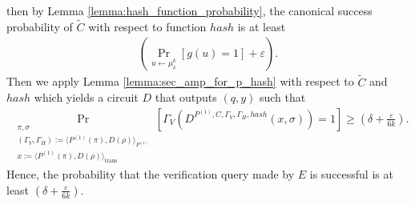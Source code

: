 then by Lemma \ref{lemma:hash_function_probability}, the canonical success
probability of $\widetilde{C}$ with respect to function $hash$ is at least
\begin{align*}
\left(\underset{u \leftarrow \mu_\delta^k}{\Pr}\left[g(u) = 1\right] + \varepsilon\right).
\end{align*}
Then we apply Lemma \ref{lemma:sec_amp_for_p_hash} with respect to $\widetilde{C}$ and $hash$ which yields a circuit $D$ that
outputs $(q, y)$ such that
\begin{align*}
    \underset{\substack{\pi, \sigma \\ (\Gamma_V,\Gamma_H) := \langle P^{(1)}(\pi), D(\rho) \rangle_{P^{(1)}} \\ x := \langle P^{(1)}(\pi), D(\rho) \rangle_{\text{trans}}}}
    {\Pr}\left[\Gamma_V(D^{P^{(1)},C,\Gamma_V, \Gamma_H, hash}(x, \sigma)) = 1\right] \geq (\delta + \frac{\varepsilon}{6k}).
\end{align*}
Hence, the probability that the verification query made by $E$ is successful is at least $(\delta + \frac{\varepsilon}{6k})$.

